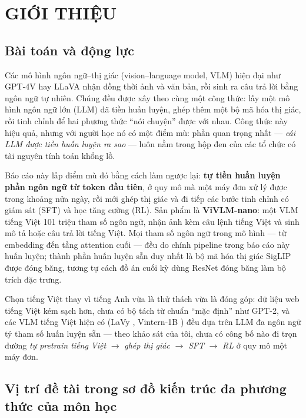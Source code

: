 \chapter{GIỚI THIỆU}
\label{chap:intro}

\section{Bài toán và động lực}

Các mô hình ngôn ngữ--thị giác (vision--language model, VLM) hiện đại như GPT-4V
hay LLaVA \autocite{liu2023llava} nhận đồng thời ảnh và văn bản, rồi sinh ra câu
trả lời bằng ngôn ngữ tự nhiên. Chúng đều được xây theo cùng một công thức:
lấy một mô hình ngôn ngữ lớn (LLM) đã tiền huấn luyện, ghép thêm một bộ mã hóa
thị giác, rồi tinh chỉnh để hai phương thức ``nói chuyện'' được với nhau. Công
thức này hiệu quả, nhưng với người học nó có một điểm mù: phần quan trọng
nhất --- \emph{cái LLM được tiền huấn luyện ra sao} --- luôn nằm trong hộp đen
của các tổ chức có tài nguyên tính toán khổng lồ.

Báo cáo này lấp điểm mù đó bằng cách làm ngược lại: \textbf{tự tiền huấn luyện
phần ngôn ngữ từ token đầu tiên}, ở quy mô mà một máy đơn xử lý được trong
khoảng nửa ngày, rồi mới ghép thị giác và đi tiếp các bước tinh chỉnh có giám
sát (SFT) và học tăng cường (RL). Sản phẩm là \textbf{ViVLM-nano}: một VLM
tiếng Việt 101 triệu tham số ngôn ngữ, nhận ảnh kèm câu lệnh tiếng Việt và sinh
mô tả hoặc câu trả lời tiếng Việt. Mọi tham số ngôn ngữ trong mô hình --- từ
embedding đến tầng attention cuối --- đều do chính pipeline trong báo cáo này
huấn luyện; thành phần huấn luyện sẵn duy nhất là bộ mã hóa thị giác SigLIP
\autocite{zhai2023siglip} được đóng băng, tương tự cách đồ án cuối kỳ dùng
ResNet đóng băng làm bộ trích đặc trưng.

Chọn tiếng Việt thay vì tiếng Anh vừa là thử thách vừa là đóng góp: dữ liệu web
tiếng Việt kém sạch hơn, chưa có bộ tách từ chuẩn ``mặc định'' như GPT-2, và các
VLM tiếng Việt hiện có (LaVy \autocite{tran2024lavy}, Vintern-1B
\autocite{doan2024vintern}) đều dựa trên LLM đa ngôn ngữ tỷ tham số huấn luyện
sẵn --- theo khảo sát của tôi, chưa có công bố nào đi trọn đường
\emph{tự pretrain tiếng Việt} $\rightarrow$ \emph{ghép thị giác} $\rightarrow$
\emph{SFT} $\rightarrow$ \emph{RL} ở quy mô một máy đơn.

\section{Vị trí đề tài trong sơ đồ kiến trúc đa phương thức của môn học}
\label{sec:intro-diagram}

